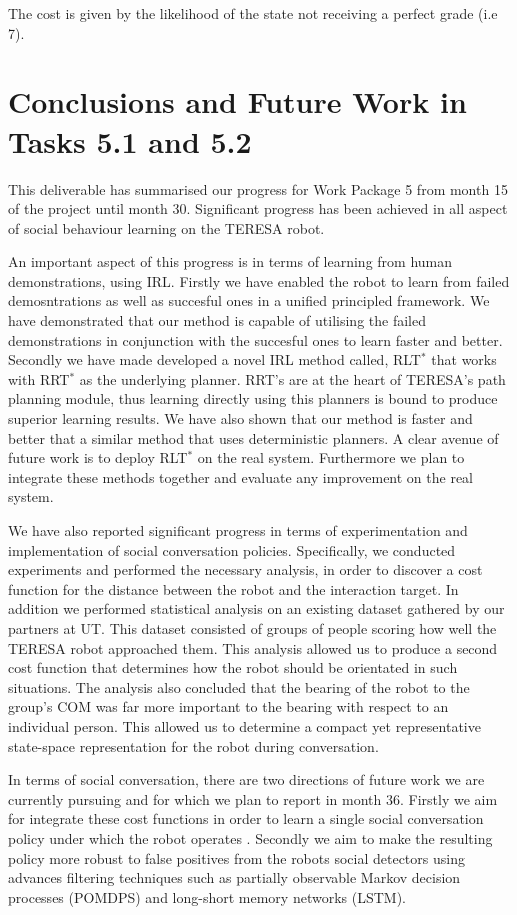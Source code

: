 \documentclass[a4paper,11pt]{report}
\begin{document}
The cost is given by the likelihood of the state not receiving a perfect grade (i.e 7).

\section{Conclusions and Future Work in Tasks 5.1 and 5.2}
\label{sec:conclusions}
This deliverable has summarised our progress for Work Package 5 from month 15 of the project until month 30. Significant progress has been achieved in all aspect of social behaviour learning on the TERESA robot. 

 An important aspect of this progress is in terms of learning from human demonstrations, using IRL. Firstly we have enabled the robot to learn from failed demosntrations as well as succesful ones in a unified principled framework. We have demonstrated that our method is capable of utilising the failed demonstrations in conjunction with the succesful ones to learn faster and better. Secondly we have made developed a novel IRL method called, RLT$^*$ that works with RRT$^*$ as the underlying planner. RRT's are at the heart of TERESA's path planning module, thus learning directly using this planners is bound to produce superior learning results. We have also shown that our method is faster and better that a similar method that uses deterministic planners. A clear avenue of future work is to deploy RLT$^*$ on the real system. Furthermore we plan to integrate these methods together and evaluate any improvement on the real system.

 We have also reported significant progress in terms of experimentation and implementation of social conversation policies. Specifically, we conducted experiments and performed the necessary analysis, in order to discover a cost function for the distance between the robot and the interaction target. In addition we performed statistical analysis on an existing dataset gathered by our partners at UT. This dataset consisted of groups of people scoring how well the TERESA robot approached them. This analysis allowed us to produce a second cost function that determines how the robot should be orientated in such situations. The analysis also concluded that the bearing of the robot to the group's COM was far more important to the bearing with respect to an individual person. This allowed us to determine a compact yet representative state-space representation for the robot during conversation. 

 In terms of social conversation, there are two directions of future work we are currently pursuing and for which we plan to report in month 36. Firstly we aim for integrate these cost functions in order to learn a single social conversation policy under which the robot operates . Secondly we aim to make the resulting policy more robust to false positives from the robots social detectors using advances filtering techniques such as partially observable Markov decision processes (POMDPS) and long-short memory networks (LSTM).






\end{document}
